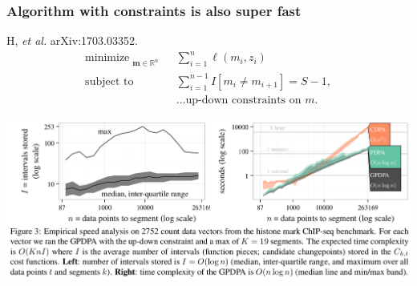 \documentclass{beamer}
\DeclareMathOperator*{\minimize}{minimize}
\newcommand{\RR}{\mathbb R}
\begin{document}
\begin{frame}
  \frametitle{Algorithm with constraints is also super fast}
  H, {\it et al.} arXiv:1703.03352.
\vskip -0.5cm
  \begin{align*}
    \minimize_{\substack{
  \mathbf m\in\RR^{n}
  }} &\ \ 
    \sum_{i=1}^n \ell( m_i,  z_i) 
\\
      \text{subject to} &\ \ {{\sum_{i=1}^{n-1} I[m_i\neq m_{i+1}]}=S-1,}
  \nonumber\\
  &\ \ \text{...up-down constraints on $m$.}
  \nonumber 
\end{align*}

\includegraphics[width=\textwidth]{screenshot-GPDPA-intervals}

\end{frame}
\end{document}
